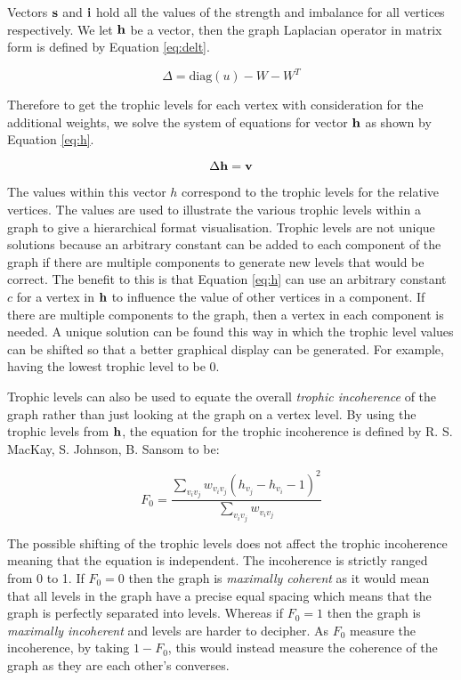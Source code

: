 Vectors $\bold{s}$ and $\bold{i}$ hold all the values of the strength and imbalance for all vertices respectively. We let $\bold{h}$ be a vector, then the graph Laplacian operator in matrix form is defined by Equation \ref{eq:delt}.  

\begin{equation} \label{eq:delt}
\Delta = \text{diag}(u) - W - W^T
\end{equation}

Therefore to get the trophic levels for each vertex with consideration for the additional weights, we solve the system of equations for vector $\bold{h}$ as shown by Equation \ref{eq:h}.

\begin{equation} \label{eq:h}
\Delta \bold{h} = \bold{v} 
\end{equation}

The values within this vector $h$ correspond to the trophic levels for the relative vertices. The values are used to illustrate the various trophic levels within a graph to give a hierarchical format visualisation. Trophic levels are not unique solutions because an arbitrary constant can be added to each component of the graph if there are multiple components to generate new levels that would be correct. The benefit to this is that Equation \ref{eq:h} can use an arbitrary constant $c$ for a vertex in $\bold{h}$ to influence the value of other vertices in a component. If there are multiple components to the graph, then a vertex in each component is needed. A unique solution can be found this way in which the trophic level values can be shifted so that a better graphical display can be generated. For example, having the lowest trophic level to be 0. 

Trophic levels can also be used to equate the overall \emph{trophic incoherence} of the graph rather than just looking at the graph on a vertex level. By using the trophic levels from $\bold{h}$, the equation for the trophic incoherence is defined by R. S. MacKay, S. Johnson, B. Sansom \cite{johnson2020digraphs} to be:

\begin{equation}
F_0=\frac{\sum_{v_iv_j}w_{v_iv_j}(h_{v_j}-h_{v_i}-1)^2}{\sum_{v_iv_j}w_{v_iv_j}}
\end{equation}

The possible shifting of the trophic levels does not affect the trophic incoherence meaning that the equation is independent. The incoherence is strictly ranged from 0 to 1. If $F_0 = 0$  then the graph is \emph{maximally coherent} as it would mean that all levels in the graph have a precise equal spacing which means that the graph is perfectly separated into levels. Whereas if $F_0 = 1$ then the graph is \emph{maximally incoherent} and levels are harder to decipher. As $F_0$ measure the incoherence, by taking $1 - F_0$, this would instead measure the coherence of the graph as they are each other's converses. 
\newline

